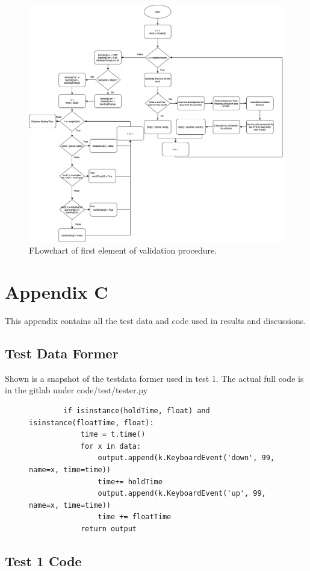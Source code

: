 \documentclass[10pt,a4paper]{report}
\begin{document}
\begin{figure}
	\centering
	\includegraphics[scale=0.30]{ValidationProc}
	\caption{FLowchart of first element of validation procedure.}
	\label{fig:valProc}
\end{figure}

\chapter*{Appendix C}

This appendix contains all the test data and code used in results and discussions.

\section*{Test Data Former}

Shown is a snapshot of the testdata former used in test 1. The actual full code is in the gitlab under code/test/tester.py
\begin{figure}
	\begin{lstlisting}
		if isinstance(holdTime, float) and isinstance(floatTime, float):
        	time = t.time()
        	for x in data:
            	output.append(k.KeyboardEvent('down', 99, name=x, time=time))
            	time+= holdTime
           	 	output.append(k.KeyboardEvent('up', 99, name=x, time=time))
            	time += floatTime
        	return output
     \end{lstlisting}
\end{figure}

\section*{Test 1 Code}
\end{document}
